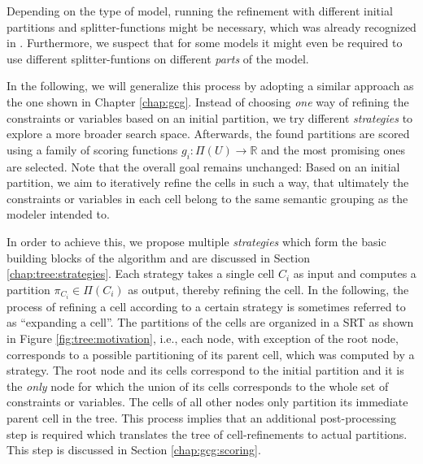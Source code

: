 		Depending on the type of model, running the refinement with different initial partitions and splitter-functions might be necessary, which was already recognized in \cite{salvagninDetectingSemanticGroups2016}.
		Furthermore, we suspect that for some models it might even be required to use different splitter-funtions on different \textit{parts} of the model.

		In the following, we will generalize this process by adopting a similar approach as the one shown in Chapter \ref{chap:gcg}.
		Instead of choosing \textit{one} way of refining the constraints or variables based on an initial partition, we try different \textit{strategies} to explore a more broader search space.
		Afterwards, the found partitions are scored using a family of scoring functions $g_i: \Pi(U) \rightarrow \mathbb{R}$ and the most promising ones are selected.
		Note that the overall goal remains unchanged: Based on an initial partition, we aim to iteratively refine the cells in such a way, that ultimately the constraints or variables in each cell belong to the same semantic grouping as the modeler intended to.

		In order to achieve this, we propose multiple \textit{strategies} which form the basic building blocks of the algorithm and are discussed in Section \ref{chap:tree:strategies}.
		Each strategy takes a single cell $C_i$ as input and computes a partition $\pi_{C_i} \in \Pi(C_i)$ as output, thereby refining the cell.
		In the following, the process of refining a cell according to a certain strategy is sometimes referred to as \enquote{expanding a cell}.
		The partitions of the cells are organized in a \acf{SRT} as shown in Figure \ref{fig:tree:motivation}, i.e., each node, with exception of the root node, corresponds to a possible partitioning of its parent cell, which was computed by a strategy.
		The root node and its cells correspond to the initial partition and it is the \textit{only} node for which the union of its cells corresponds to the whole set of constraints or variables. The cells of all other nodes only partition its immediate parent cell in the tree.
		This process implies that an additional post-processing step is required which translates the tree of cell-refinements to actual partitions. This step is discussed in Section \ref{chap:gcg:scoring}.

